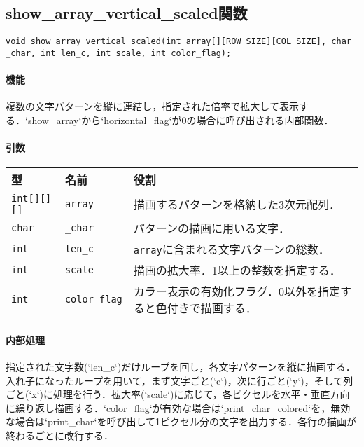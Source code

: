 \documentclass[uplatex]{jsarticle}
\begin{document}
\subsection{show\_array\_vertical\_scaled関数}
\texttt{void show\_array\_vertical\_scaled(int array[][ROW\_SIZE][COL\_SIZE], char \_char, int len\_c, int scale, int color\_flag);}
\paragraph{機能}
複数の文字パターンを縦に連結し，指定された倍率で拡大して表示する．`show\_array`から`horizontal\_flag`が0の場合に呼び出される内部関数．

\paragraph{引数}
\begin{center}
    \begin{tabular}{|l|l|p{7cm}|}
        \hline
        \textbf{型} & \textbf{名前} & \textbf{役割} \\ \hline
        \texttt{int[][][]} & \texttt{array} & 描画するパターンを格納した3次元配列． \\ \hline
        \texttt{char} & \texttt{\_char} & パターンの描画に用いる文字． \\ \hline
        \texttt{int} & \texttt{len\_c} & \texttt{array}に含まれる文字パターンの総数． \\ \hline
        \texttt{int} & \texttt{scale} & 描画の拡大率．1以上の整数を指定する． \\ \hline
        \texttt{int} & \texttt{color\_flag} & カラー表示の有効化フラグ．0以外を指定すると色付きで描画する． \\ \hline
    \end{tabular}
\end{center}

\paragraph{内部処理}
指定された文字数(`len\_c`)だけループを回し，各文字パターンを縦に描画する．入れ子になったループを用いて，まず文字ごと(`c`)，次に行ごと(`y`)，そして列ごと(`x`)に処理を行う．拡大率(`scale`)に応じて，各ピクセルを水平・垂直方向に繰り返し描画する．`color\_flag`が有効な場合は`print\_char\_colored`を，無効な場合は`print\_char`を呼び出して1ピクセル分の文字を出力する．各行の描画が終わるごとに改行する．
\end{document}
